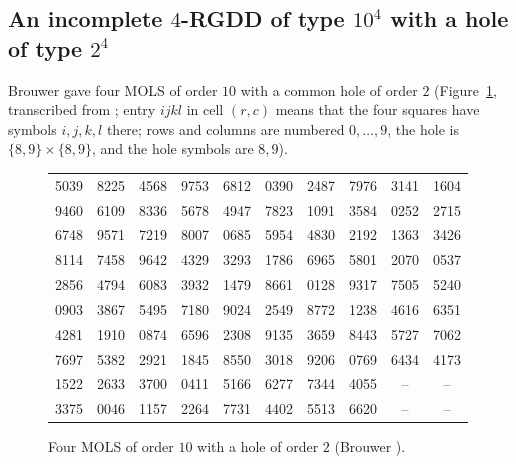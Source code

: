\documentclass[11pt]{article}
\theoremstyle{remark}
\begin{document}
\subsection{\texorpdfstring{An incomplete $4$-RGDD of type $10^{4}$ with a hole of type $2^{4}$}{An incomplete 4-RGDD of type 10\textasciicircum 4 with a hole of type 2\textasciicircum 4}}\label{sec:brouwer}

Brouwer \cite{Bro84} gave four MOLS of order $10$ with a common hole of order $2$
(Figure~\ref{fig:brouwer}, transcribed from \cite[Fig.~1]{Bro84}; entry $ijkl$ in cell
$(r,c)$ means that the four squares have symbols $i,j,k,l$ there; rows and columns are
numbered $0,\dots,9$, the hole is $\{8,9\}\times\{8,9\}$, and the hole symbols are $8,9$).

\begin{figure}[ht]
\centering
\begin{tabular}{*{10}{c}}
5039 & 8225 & 4568 & 9753 & 6812 & 0390 & 2487 & 7976 & 3141 & 1604\\
9460 & 6109 & 8336 & 5678 & 4947 & 7823 & 1091 & 3584 & 0252 & 2715\\
6748 & 9571 & 7219 & 8007 & 0685 & 5954 & 4830 & 2192 & 1363 & 3426\\
8114 & 7458 & 9642 & 4329 & 3293 & 1786 & 6965 & 5801 & 2070 & 0537\\
2856 & 4794 & 6083 & 3932 & 1479 & 8661 & 0128 & 9317 & 7505 & 5240\\
0903 & 3867 & 5495 & 7180 & 9024 & 2549 & 8772 & 1238 & 4616 & 6351\\
4281 & 1910 & 0874 & 6596 & 2308 & 9135 & 3659 & 8443 & 5727 & 7062\\
7697 & 5382 & 2921 & 1845 & 8550 & 3018 & 9206 & 0769 & 6434 & 4173\\
1522 & 2633 & 3700 & 0411 & 5166 & 6277 & 7344 & 4055 & --   & --  \\
3375 & 0046 & 1157 & 2264 & 7731 & 4402 & 5513 & 6620 & --   & --
\end{tabular}
\caption{Four MOLS of order $10$ with a hole of order $2$ (Brouwer \cite{Bro84}).}
\label{fig:brouwer}
\end{figure}
\end{document}
